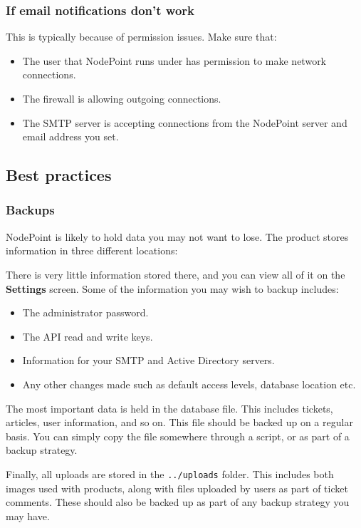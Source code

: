 \documentclass[11pt]{article}
\begin{document}
\subsubsection{If email notifications don't work}

This is typically because of permission issues. Make sure that:
\begin{itemize}
\item The user that NodePoint runs under has permission to make network connections.
\item The firewall is allowing outgoing connections.
\item The SMTP server is accepting connections from the NodePoint server and email address you set.
\end{itemize}

\subsection{Best practices}
\subsubsection{Backups}
NodePoint is likely to hold data you may not want to lose. The product stores information in three different locations:

 There is very little information stored there, and you can view all of it on the \textbf{Settings} screen. Some of the information you may wish to backup includes:

\begin{itemize}
\item The administrator password.
\item The API read and write keys.
\item Information for your SMTP and Active Directory servers.
\item Any other changes made such as default access levels, database location etc.
\end{itemize}

The most important data is held in the database file. This includes tickets, articles, user information, and so on. This file should be backed up on a regular basis. You can simply copy the file somewhere through a script, or as part of a backup strategy.

Finally, all uploads are stored in the \texttt{../uploads} folder. This includes both images used with products, along with files uploaded by users as part of ticket comments. These should also be backed up as part of any backup strategy you may have.
\end{document}
